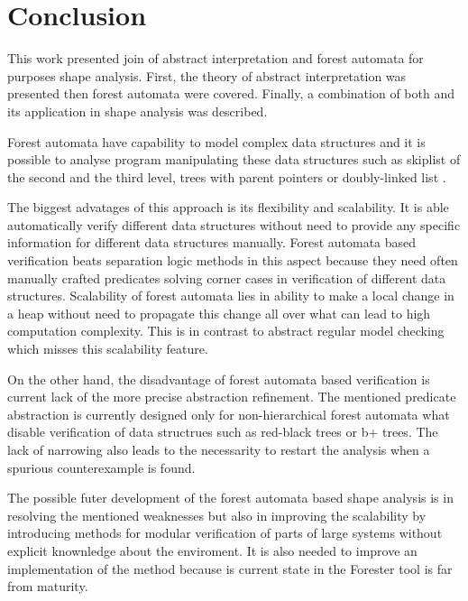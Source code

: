 \documentclass[a4paper, 12pt]{article}
\begin{document}
\section{Conclusion}

This work presented join of abstract interpretation and forest automata
for purposes shape analysis.
First, the theory of abstract interpretation was presented then forest automata
were covered.
Finally, a combination of both and its application in shape analysis
was described.

Forest automata have capability to model complex data structures
and it is possible to analyse program manipulating these data structures
such as skiplist of the second and the third level, trees with parent pointers
or doubly-linked list \cite{sv-comp}.

The biggest advatages of this approach is its flexibility and scalability.
It is able automatically verify different data structures without need to
provide any specific information for different data structures manually.
Forest automata based verification beats separation logic methods in this aspect
because they need often manually crafted predicates solving corner cases in verification
of different data structures.
Scalability of forest automata lies in ability to make a local
change in a heap without need to propagate this change all over
what can lead to high computation complexity.
This is in contrast to abstract regular model checking which
misses this scalability feature.

On the other hand, the disadvantage of forest automata based verification
is current lack of the more precise abstraction refinement.
The mentioned predicate abstraction is currently designed only for
non-hierarchical forest automata what disable verification of
data structrues such as red-black trees or b+ trees.
The lack of narrowing also leads to the necessarity to restart
the analysis when a spurious counterexample is found.

The possible futer development of the forest automata based shape analysis
is in resolving the mentioned weaknesses but also in improving
the scalability by introducing methods for modular verification
of parts of large systems without explicit knownledge about the enviroment.
It is also needed to improve an implementation of the method because
is current state in the Forester tool is far from maturity.

\newpage


\end{document}
